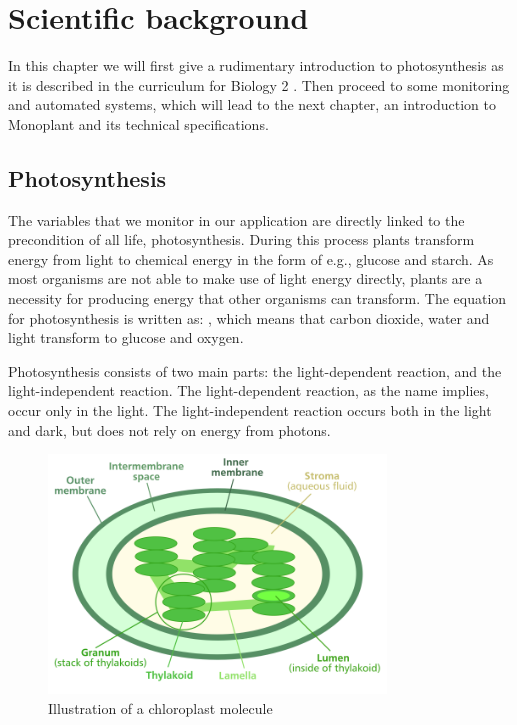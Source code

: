 \chapter{Scientific background}
\label{cha:scientificbg}
In this chapter we will first give a rudimentary introduction to photosynthesis as it is described in the curriculum for Biology 2 \citep{bios}. Then proceed to some monitoring and automated systems, which will lead to the next chapter, an introduction to Monoplant and its technical specifications.

\section{Photosynthesis}
The variables that we monitor in our application are directly linked to the precondition of all life, photosynthesis. During this process plants transform energy from light to chemical energy in the form of e.g., glucose and starch. As most organisms are not able to make use of light energy directly, plants are a necessity for producing energy that other organisms can transform. The equation for photosynthesis is written as: , which means that carbon dioxide, water and light transform to glucose and oxygen.  

Photosynthesis consists of two main parts: the light-dependent reaction, and the light-independent reaction. The light-dependent reaction, as the name implies, occur only in the light. The light-independent reaction occurs both in the light and dark, but does not rely on energy from photons.  

\begin{figure}
\centering
\includegraphics[width=0.8\textwidth]{img/photosynthesis/Chloroplast_diagram.png}
\caption{Illustration of a chloroplast molecule \citep{wiki:chloroplast}}
\label{fig:chloroplast}
\end{figure}

